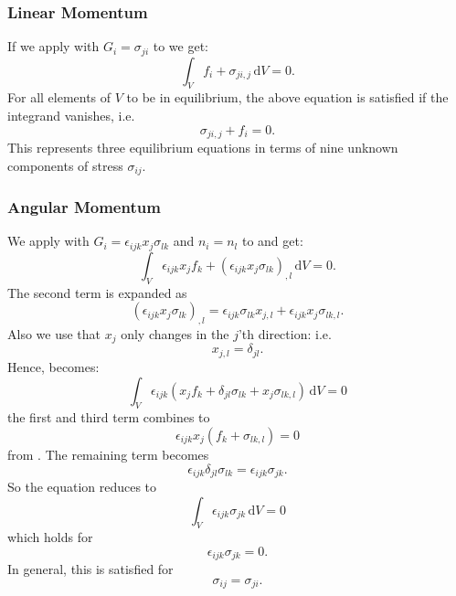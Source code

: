 \subsubsection{Linear Momentum}
If we apply  with $G_i = \sigma_{ji}$ to  we get:
\begin{equation*}
  \int_V f_i + \sigma_{ji, j} \, \mathrm{d}V = 0
.\end{equation*}
For all elements of $V$ to be in equilibrium, the above equation is satisfied if the integrand vanishes, i.e.
\begin{equation} \label{eq:linmomres}
  \sigma_{ji,j} + f_i = 0
.\end{equation}
This represents three equilibrium equations in terms of nine unknown components of stress $\sigma_{ij}$.

\subsubsection{Angular Momentum}
We apply  with $G_i = \epsilon_{ijk} x_j \sigma_{lk}$ and $n_i = n_l$ to  and get:
\begin{equation} \label{eq:angmom}
  \int_V \epsilon_{ijk} x_j f_k + \left( \epsilon_{ijk} x_j \sigma_{lk} \right)_{,l} \, \mathrm{d}V = 0
.\end{equation}
The second term is expanded as
\begin{equation*}
  \left( \epsilon_{ijk} x_j \sigma_{lk} \right)_{,l} = \epsilon_{ijk} \sigma_{lk} x_{j,l} + \epsilon_{ijk} x_j \sigma_{lk,l}
.\end{equation*}
Also we use that $x_j$ only changes in the $j$'th direction: i.e.
\begin{equation*}
  x_{j,l} = \delta_{jl}
.\end{equation*}
Hence,  becomes:
\begin{equation*}
  \int_V \epsilon_{ijk} \left( x_j f_k + \delta_{jl} \sigma_{lk} + x_j \sigma_{lk,l} \right) \, \mathrm{d}V = 0
\end{equation*}
the first and third term combines to
\begin{equation*}
  \epsilon_{ijk} x_j \left( f_k + \sigma_{lk,l} \right) = 0
\end{equation*}
from .
The remaining term becomes
\begin{equation*}
  \epsilon_{ijk} \delta_{jl} \sigma_{lk} = \epsilon_{ijk} \sigma_{jk}
.\end{equation*}
So the equation reduces to
\begin{equation*}
  \int_V \epsilon_{ijk} \sigma_{jk} \, \mathrm{d}V = 0
\end{equation*}
which holds for
\begin{equation*}
  \epsilon_{ijk} \sigma_{jk} = 0
.\end{equation*}
In general, this is satisfied for
\begin{equation*}
  \sigma_{ij} = \sigma_{ji}
.\end{equation*}

